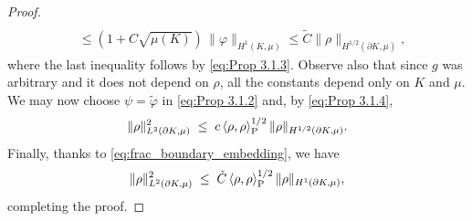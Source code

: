 \documentclass[a4paper, 11pt]{article}
\theoremstyle{definition}
\begin{document}
\begin{proof}
\begin{align}
        \\
        &\leq \left(1+C\sqrt{\mu(K)}\right)\,\|\varphi\|_{H^{1}(K,\mu)}
        \leq \tilde{C}\|\rho\|_{H^{1/2}(\partial K,\mu)},
    \end{align}
    where the last inequality follows by \eqref{eq:Prop 3.1.3}. Observe also that since $g$ was arbitrary and it does not depend on $\rho$, all the constants depend only on $K$ and $\mu$. We may now choose $\psi = \tilde{\varphi}$ in \eqref{eq:Prop 3.1.2} and, by \eqref{eq:Prop 3.1.4},
    \[
    \|\rho\|^2_{L^2(\partial K, \mu)}
    \;\leq\;
    c\,
    \langle \rho,\rho \rangle_{\rm P}^{1/2}\,
    \|\rho\|_{H^{1/2}(\partial K,\mu)}. 
    \] 
    Finally, thanks to \eqref{eq:frac_boundary_embedding}, we have
    \[
    \|\rho\|^2_{L^2(\partial K, \mu)}
    \;\leq\;
    \tilde{C}\,
    \langle \rho,\rho \rangle_{\rm P}^{1/2}\,
    \|\rho\|_{H^{1}(\partial K,\mu)},
    \]
    completing the proof.
\end{proof}
\end{document}
